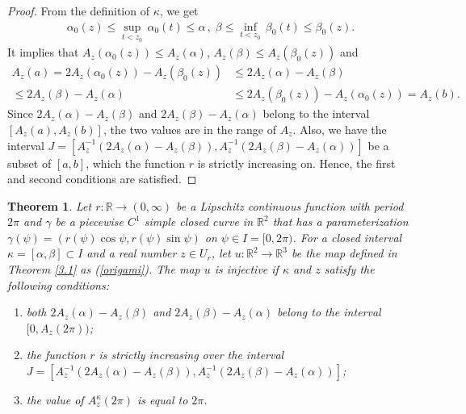 \documentclass{amsart}
\theoremstyle{plain}
\newtheorem{theorem}{Theorem}[section]
\theoremstyle{definition}
\theoremstyle{remark}
\begin{document}
\begin{proof}
From the definition of $\kappa$, we get
\begin{align*}
\alpha_0(z)\le\sup_{t<z_0}\,\alpha_0(t)\le\alpha\,,\;\beta\le\inf_{t<z_0}\,\beta_0(t)\le\beta_0(z).
\end{align*}
It implies that $A_z(\alpha_0(z))\le A_z(\alpha)$, $A_z(\beta)\le A_z(\beta_0(z))$ and
\begin{align*}
A_z(a)=2A_z(\alpha_0(z))-A_z(\beta_0(z))&\le2A_z(\alpha)-A_z(\beta)\\
\le2A_z(\beta)-A_z(\alpha)&\le2A_z(\beta_0(z))-A_z(\alpha_0(z))=A_z(b).
\end{align*}
Since $2A_z(\alpha)-A_z(\beta)$ and $2A_z(\beta)-A_z(\alpha)$ belong to the interval $[A_z(a),A_z(b)]$, the two values are in the range of $A_z$.
Also, we have the interval $J=[A_z^{-1}(2A_z(\alpha)-A_z(\beta)),A_z^{-1}(2A_z(\beta)-A_z(\alpha))]$ be a subset of $[a,b]$, which the function $r$ is strictly increasing on.
Hence, the first and second conditions are satisfied.
\end{proof}







\begin{theorem}\label{4.4} %
Let $r:\mathbb{R}\to(0,\infty)$ be a Lipschitz continuous function with period $2\pi$ and $\gamma$ be a piecewise $C^1$ simple closed curve in $\mathbb{R}^2$ that has a parameterization $\gamma(\psi)=(r(\psi)\cos\psi,r(\psi)\sin\psi)$ on $\psi\in I=[0,2\pi)$. 
For a closed interval $\kappa=[\alpha,\beta]\subset I$ and a real number $z\in U_r$, let $u:\mathbb{R}^2\to\mathbb{R}^3$ be the map defined in Theorem \ref{3.1} as (\ref{origami}).
The map $u$ is injective if $\kappa$ and $z$ satisfy the following conditions:
\begin{enumerate}
\item both $2A_z(\alpha)-A_z(\beta)$ and $2A_z(\beta)-A_z(\alpha)$ belong to the interval $[0,A_z(2\pi))$;
\item the function $r$ is strictly increasing over the interval $J=[A_z^{-1}(2A_z(\alpha)-A_z(\beta)),A_z^{-1}(2A_z(\beta)-A_z(\alpha))]$;
\item the value of $A_z^{\kappa}(2\pi)$ is equal to $2\pi$.
\end{enumerate}
\end{theorem}
\end{document}
